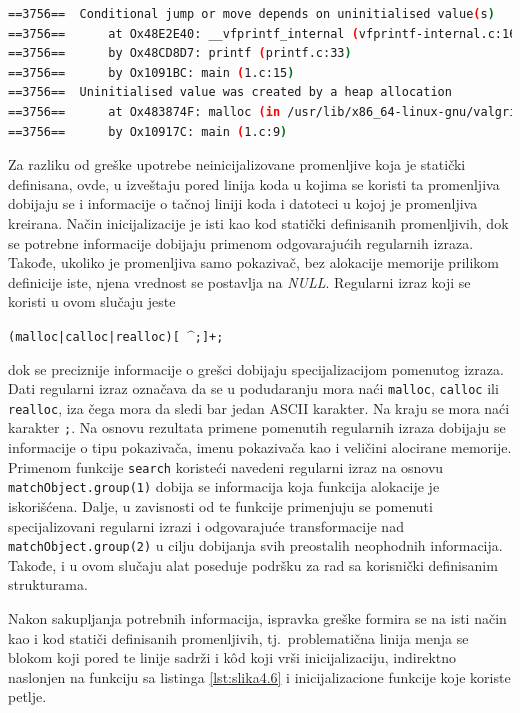 \documentclass[12pt,oneside]{memoir}
\theoremstyle{plain}
\theoremstyle{definition}
\begin{document}
\begin{lstlisting}[style=terminal,caption={Ispis greške korišćenja dinamički alocirane neinicijalizovane promenljive (pokazivača)}, label={lst:slika4.7},language={bash}]   
==3756==  Conditional jump or move depends on uninitialised value(s)
==3756==      at Ox48E2E40: __vfprintf_internal (vfprintf-internal.c:1644)
==3756==      by Ox48CD8D7: printf (printf.c:33)
==3756==      by Ox1091BC: main (1.c:15)
==3756==  Uninitialised value was created by a heap allocation
==3756==      at Ox483874F: malloc (in /usr/lib/x86_64-linux-gnu/valgrind/vgpreload_memcheck-amd64-linux.so) 
==3756==      by Ox10917C: main (1.c:9)
\end{lstlisting}

Za razliku od greške upotrebe neinicijalizovane promenljive koja je statički definisana, ovde, u izveštaju pored linija koda u kojima se koristi ta promenljiva dobijaju se i informacije o tačnoj liniji koda i datoteci u kojoj je promenljiva kreirana. Način inicijalizacije je isti kao kod statički definisanih promenljivih, dok se potrebne informacije dobijaju primenom odgovarajućih regularnih izraza. Takođe, ukoliko je promenljiva samo pokazivač, bez alokacije memorije prilikom definicije iste, njena vrednost se postavlja na \textit{NULL}. Regularni izraz koji se koristi u ovom slučaju jeste 
\begin{center}
\texttt{(malloc|calloc|realloc)[ $\^$;]+;}
\end{center}
dok se preciznije informacije o grešci dobijaju specijalizacijom pomenutog izraza. Dati regularni izraz označava da se u podudaranju mora naći \texttt{malloc}, \texttt{calloc} ili \texttt{realloc}, iza čega mora da sledi bar jedan ASCII karakter. Na kraju se mora naći karakter \texttt{;}. Na osnovu rezultata primene pomenutih regularnih izraza dobijaju se informacije o tipu pokazivača, imenu pokazivača kao i veličini alocirane memorije. Primenom funkcije \texttt{search} koristeći navedeni regularni izraz na osnovu \texttt{matchObject.group(1)} dobija se informacija koja funkcija alokacije je iskorišćena. Dalje, u zavisnosti od te funkcije primenjuju se pomenuti specijalizovani regularni izrazi i odgovarajuće transformacije nad \texttt{matchObject.group(2)} u cilju dobijanja svih preostalih neophodnih informacija. Takođe, i u ovom slučaju alat poseduje podršku za rad sa korisnički definisanim strukturama. 

Nakon sakupljanja potrebnih informacija, ispravka greške formira se na isti način kao i kod statiči definisanih promenljivih, tj.~problematična linija menja se blokom koji pored te linije sadrži i k\^od koji vrši inicijalizaciju, indirektno naslonjen na funkciju sa listinga \ref{lst:slika4.6} i inicijalizacione funkcije koje koriste petlje.
\end{document}
